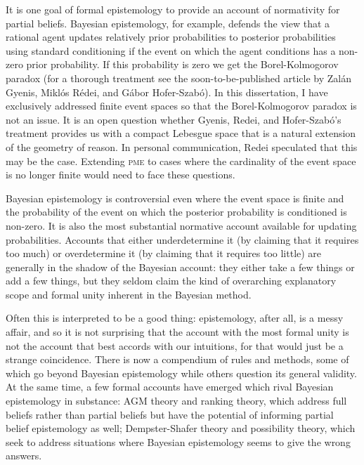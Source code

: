 \documentclass[phd,12pt,oneside]{ubcthesis}
\begin{document}
It is one goal of formal epistemology to provide an account of
normativity for partial beliefs. Bayesian epistemology, for example,
defends the view that a rational agent updates relatively prior
probabilities to posterior probabilities using standard conditioning
if the event on which the agent conditions has a non-zero prior
probability. If this probability is zero we get the Borel-Kolmogorov
paradox (for a thorough treatment see the soon-to-be-published article
 by Zal{\'a}n Gyenis, Mikl{\'o}s R{\'e}dei,
and G{\'a}bor Hofer-Szab{\'o}). In this dissertation, I have
exclusively addressed finite event spaces so that the Borel-Kolmogorov
paradox is not an issue. It is an open question whether Gyenis, Redei,
and Hofer-Szab{\'o}'s treatment provides us with a compact Lebesgue
space that is a natural extension of the geometry of reason. In
personal communication, Redei speculated that this may be the case.
Extending \textsc{pme} to cases where the cardinality of the event
space is no longer finite would need to face these questions.

Bayesian epistemology is controversial even where the event space is
finite and the probability of the event on which the posterior
probability is conditioned is non-zero. It is also the most
substantial normative account available for updating probabilities.
Accounts that either underdetermine it (by claiming that it requires
too much) or overdetermine it (by claiming that it requires too
little) are generally in the shadow of the Bayesian account: they
either take a few things or add a few things, but they seldom claim
the kind of overarching explanatory scope and formal unity inherent in
the Bayesian method.

Often this is interpreted to be a good thing: epistemology, after all,
is a messy affair, and so it is not surprising that the account with
the most formal unity is not the account that best accords with our
intuitions, for that would just be a strange coincidence. There is now
a compendium of rules and methods, some of which go beyond Bayesian
epistemology while others question its general validity. At the same
time, a few formal accounts have emerged which rival Bayesian
epistemology in substance: AGM theory and ranking theory, which
address full beliefs rather than partial beliefs but have the
potential of informing partial belief epistemology as well;
Dempster-Shafer theory and possibility theory, which seek to address
situations where Bayesian epistemology seems to give the wrong
answers.
\end{document}
